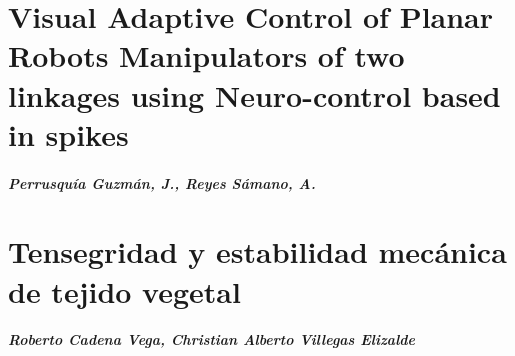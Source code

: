     \chapter{Visual Adaptive Control of Planar Robots Manipulators of two linkages using Neuro-control based in spikes}
    \paragraph{Perrusqu\'ia Guzm\'an, J., Reyes S\'amano, A.}
    

    \chapter{Tensegridad y estabilidad mecánica de tejido vegetal}
    \paragraph{Roberto Cadena Vega, Christian Alberto Villegas Elizalde}
    



